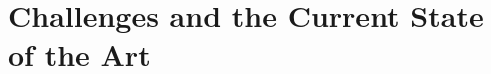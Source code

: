 \documentclass[preprint,11pt]{aastex}
\begin{document}








\vspace{-20pt}
\section{Challenges and the Current State of the Art}
\vspace{-5pt}
\end{document}
